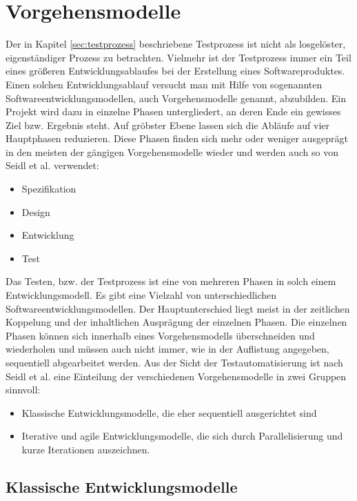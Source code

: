 \section{Vorgehensmodelle}
\label{sec:vorgehensmodelle}
Der in Kapitel \ref{sec:testprozess} beschriebene Testprozess ist nicht als losgelöster, eigenständiger Prozess zu betrachten. Vielmehr ist der Testprozess immer ein Teil eines größeren Entwicklungsablaufes bei der Erstellung eines Softwareproduktes. Einen solchen Entwicklungsablauf versucht man mit Hilfe von sogenannten Softwareentwicklungsmodellen, auch Vorgehensmodelle genannt, abzubilden.
Ein Projekt wird dazu in einzelne Phasen untergliedert, an deren Ende ein gewisses Ziel bzw. Ergebnis steht.
Auf gröbster Ebene lassen sich die Abläufe auf vier Hauptphasen reduzieren. Diese Phasen finden sich mehr oder weniger ausgeprägt in den meisten der gängigen Vorgehensmodelle wieder und werden auch so von Seidl et al. \cite[S.21 ff.]{seidl_basiswissen_2012} verwendet:

\begin{itemize}
\item Spezifikation
\item Design
\item Entwicklung
\item Test
\end{itemize}

Das Testen, bzw. der Testprozess ist eine von mehreren Phasen in solch einem Entwicklungsmodell.
Es gibt eine Vielzahl von unterschiedlichen Softwareentwicklungsmodellen. Der Hauptunterschied liegt meist in der zeitlichen Koppelung und der inhaltlichen Ausprägung der einzelnen Phasen. Die einzelnen Phasen können sich innerhalb eines Vorgehensmodells überschneiden und wiederholen und müssen auch nicht immer, wie in der Auflistung angegeben, sequentiell abgearbeitet werden.
Aus der Sicht der Testautomatisierung ist nach Seidl et al. \cite[vgl. S.21 ff.]{seidl_basiswissen_2012} eine Einteilung der verschiedenen Vorgehensmodelle in zwei Gruppen sinnvoll: 

\begin{itemize}
\item Klassische Entwicklungsmodelle, die eher sequentiell ausgerichtet sind
\item Iterative und agile Entwicklungsmodelle, die sich durch Parallelisierung und kurze Iterationen auszeichnen.
\end{itemize}

\subsection{Klassische Entwicklungsmodelle}
\label{subsec:klassische_entwicklungsmodelle}

